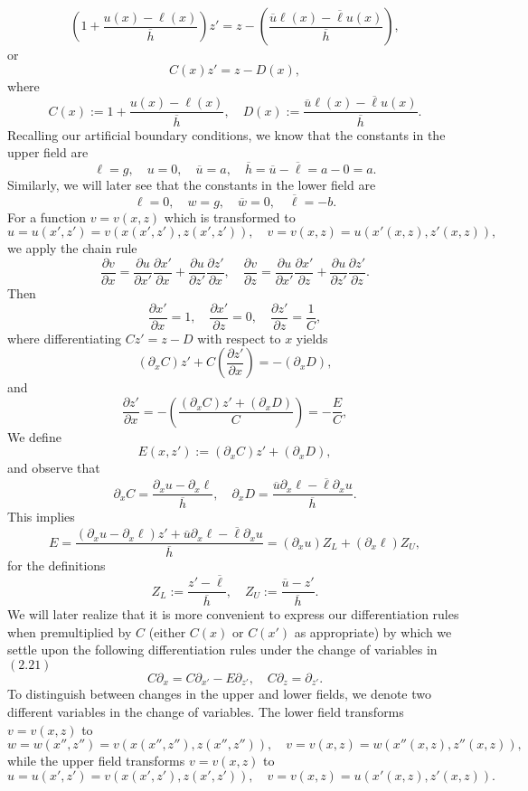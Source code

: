 $$\left(1+\frac{u(x)-\ell(x)}{\overline{h}}\right)z'= z-\left(\frac{\overline{u}\ell(x)-\overline{\ell}u(x)}{\overline{h}}\right), $$
or
$$C(x)z'=z-D(x),$$
where
$$C(x):=1+\frac{u(x)-\ell(x)}{\overline{h}},\quad D(x):=\frac{\overline{u}\ell(x)-\overline{\ell} u(x)}{\overline{h}}.$$
Recalling our artificial boundary conditions, we know that the constants in the upper field are
$$\ell=g, \quad u = 0,\quad \overline{u}=a,\quad\overline{h}=\overline{u}-\overline{\ell}=a-0=a.$$
Similarly, we will later see that the constants in the lower field are
$$\ell=0, \quad w = g,\quad \overline{w}=0,\quad\overline{\ell}=-b.$$
For a function $v=v(x,z)$ which is transformed to
$$u=u(x',z')=v(x(x',z'),z(x',z')), \quad v=v(x,z)=u(x'(x,z),z'(x,z)),$$
we apply the chain rule
$$\frac{\partial v}{\partial x}=\frac{\partial u}{\partial x'}\frac{\partial x'}{\partial x}+\frac{\partial u}{\partial z'}\frac{\partial z'}{\partial x},\quad  \frac{\partial v}{\partial z}=\frac{\partial u}{\partial x'}\frac{\partial x'}{\partial z}+\frac{\partial u}{\partial z'}\frac{\partial z'}{\partial z}.$$
Then
$$\frac{\partial x'}{\partial x}=1,\quad \frac{\partial x'}{\partial z}=0,\quad \frac{\partial z'}{\partial z}=\frac 1C,$$
where differentiating $Cz'=z-D$ with respect to $x$ yields
$$\left(\partial_x C\right)z'+C\left(\frac{\partial z'}{\partial x}\right)=-\left(\partial_x D\right),$$
and
$$\frac{\partial z'}{\partial x}=-\left(\frac{\left(\partial_x C\right)z'+\left(\partial_x D\right)}{C}\right)=-\frac EC,$$
We define
$$E(x,z'):=\left(\partial_x C\right)z'+\left(\partial_x D\right),$$
and observe that
$$\partial_x C=\frac{\partial_x u - \partial_x \ell}{\overline{h}},\quad \partial_x D=\frac{\overline{u}\partial_x \ell - \overline{\ell}\partial_x u}{\overline{h}}.   $$
This implies
$$E=\frac{(\partial_x u - \partial_x \ell)z'+\overline{u}\partial_x \ell - \overline{\ell}\partial_x u}{\overline{h}}=(\partial_x u)Z_L + (\partial_x\ell)Z_U,$$
for the definitions
$$Z_L:=\frac{z'-\overline{\ell}}{\overline{h}},\quad Z_U:=\frac{\overline{u}-z'}{\overline{h}}.$$
We will later realize that it is more convenient to express our differentiation rules when premultiplied by $C$ (either $C(x)$ or $C(x')$ as appropriate) by which we settle upon the following differentiation rules under the change of variables in $(2.21)$
\begin{equation}C\partial_x = C\partial_{x'} - E\partial_{z'},\quad C\partial_z = \partial_{z'}.\end{equation}
To distinguish between changes in the upper and lower fields, we denote two different variables in the change of variables. The lower field transforms
$v=v(x,z)$ to
$$w=w(x'',z'')=v(x(x'',z''),z(x'',z'')), \quad v=v(x,z)=w(x''(x,z),z''(x,z)),$$
while the upper field transforms $v=v(x,z)$ to
$$u=u(x',z')=v(x(x',z'),z(x',z')),\quad v=v(x,z)=u(x'(x,z),z'(x,z)).$$
